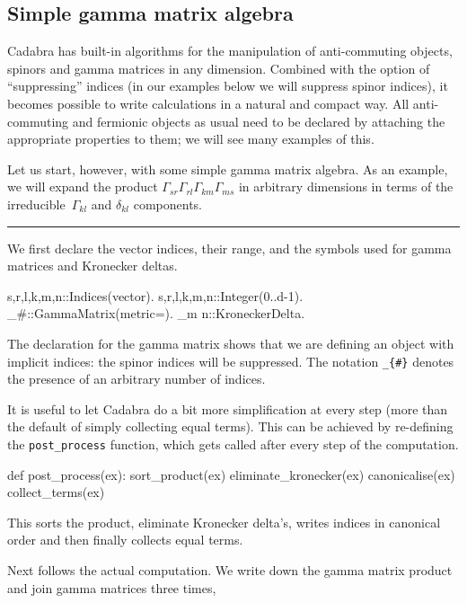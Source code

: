 \documentclass[11pt]{article}
\newenvironment{hanging}
    {\begin{list}{}{\setlength\itemsep{0pt}%
 \setlength\topsep{0pt}%
 \setlength\leftmargin{25pt}%
 \setlength\itemindent{0pt}%
 \setlength\listparindent{\itemindent}}%
     \item[]}
    {\end{list}}
\newcommand{\toprule}{\par\vspace{1ex}\noindent\hspace{25pt}\rule{435pt}{.1pt}}
\newenvironment{cdbin}{\fvset{firstnumber=1}\color[named]{Blue}\Verbatim}{\endVerbatim}
\newenvironment{cdbcont}{\fvset{firstnumber=last}\color[named]{Blue}\Verbatim}{\endVerbatim}
\newenvironment{cdbcom}{\begin{hanging}}{\end{hanging}}
\newcommand{\Cdb}{{Cadabra}\xspace}
\begin{document}
\subsection{Simple gamma matrix algebra}
\label{s:gamma}

\Cdb has built-in algorithms for the manipulation of anti-commuting
objects, spinors and gamma matrices in any dimension. Combined with
the option of ``suppressing'' indices (in our examples below we will
suppress spinor indices), it becomes possible to write calculations in
a natural and compact way. All anti-commuting and fermionic objects as
usual need to be declared by attaching the appropriate properties to
them; we will see many examples of this.

Let us start, however, with some simple gamma matrix algebra. As an
example, we will expand the product $\Gamma_{s r} \Gamma_{r l}
\Gamma_{k m} \Gamma_{m s}$ in arbitrary dimensions in terms of the
irreducible~$\Gamma_{kl}$ and $\delta_{kl}$ components.  
\toprule
\begin{cdbcom}
We first declare the vector indices, their range, and the symbols used for
gamma matrices and Kronecker deltas.
\end{cdbcom}
\begin{cdbcont}
{s,r,l,k,m,n}::Indices(vector).
{s,r,l,k,m,n}::Integer(0..d-1).
\Gamma_{#}::GammaMatrix(metric=\delta).
\delta_{m n}::KroneckerDelta.
\end{cdbcont}
\begin{cdbcom}
The declaration for the gamma matrix shows that we are defining an
object with implicit indices: the spinor indices will be
suppressed. The notation \verb|_{#}| denotes the presence of an
arbitrary number of indices.

It is useful to let Cadabra do a bit more simplification at every step
(more than the default of simply collecting equal terms). This can be
achieved by re-defining the \verb|post_process| function, which gets
called after every step of the computation.
\end{cdbcom}
\begin{cdbin}
def post_process(ex):
   sort_product(ex)
   eliminate_kronecker(ex)
   canonicalise(ex)
   collect_terms(ex)
\end{cdbin}
\begin{cdbcom}
This sorts the product, eliminate Kronecker delta's, writes indices in
canonical order and then finally collects equal terms.
  
Next follows the actual computation. We write down the gamma matrix
product and join gamma matrices three times,
\end{cdbcom}
\end{document}
